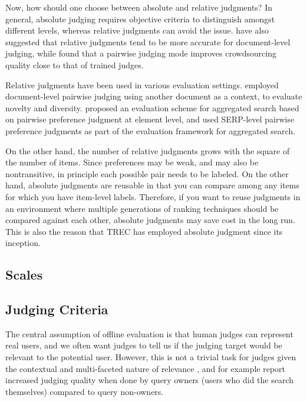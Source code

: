Now, how should one choose between absolute and relative judgments? In general, absolute judging requires objective criteria to distinguish amongst different levels, whereas relative judgments can avoid the issue. \cite{CarteretteBCD08} have also suggested that relative judgments tend to be more accurate for document-level judging, while \cite{Kazai:2013} found that a pairwise judging mode improves crowdsourcing quality close to that of trained judges.

Relative judgments have been used in various evaluation settings. \cite{Chandar2013} employed document-level pairwise judging using another document as a context, to evaluate novelty and diversity. \cite{Arguello:2011} proposed an evaluation scheme for aggregated search based on pairwise preference judgment at element level, and \cite{Zhou:2012} used SERP-level pairwise preference judgments as part of the evaluation framework for aggregated search.

On the other hand, the number of relative judgments grows with the square of the number of items. Since preferences may be weak, and may also be nontransitive, in principle each possible pair needs to be labeled. On the other hand, absolute judgments are reusable in that you can compare among any items for which you have item-level labels. Therefore, if you want to reuse judgments in an environment where multiple generations of ranking techniques should be compared against each other, absolute judgments may save cost in the long run. This is also the reason that TREC has employed absolute judgment since its inception.

\subsection{Scales}


\subsection{Judging Criteria}
The central assumption of offline evaluation is that human judges can represent real users, and we often want judges to tell us if the judging target would be relevant to the potential user. However, this is not a trivial task for judges given the contextual and multi-faceted nature of relevance \citep{Borlund:2003}, and for example \cite{Chouldechova:2013} report increased judging quality when done by query owners (users who did the search themselves) compared to query non-owners.

